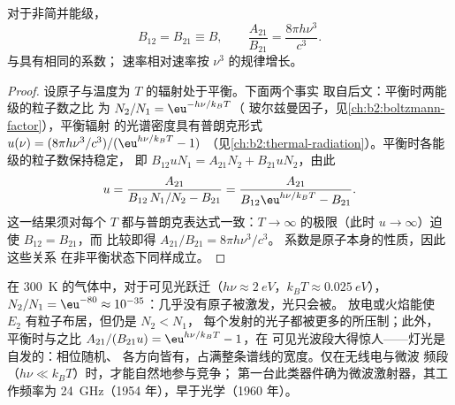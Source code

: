 \begin{proposition}[爱因斯坦关系]\label{prop:b2:laser:einstein}
对于非简并能级，
\[
B_{12} = B_{21} \equiv B, \qquad
\frac{A_{21}}{B_{21}} = \frac{8\pi h\nu^3}{c^3}.
\]
与具有相同的系数；
速率相对速率按 $\nu^3$ 的规律增长。
\end{proposition}

\begin{proof}
设原子与温度为 $T$ 的辐射处于平衡。下面两个事实
取自后文：平衡时两能级的粒子数之比
为 $N_2/N_1 = \eu^{-h\nu/k_BT}$（
玻尔兹曼因子，见\cref{ch:b2:boltzmann-factor}），平衡辐射
的光谱密度具有普朗克形式
$u(\nu) = (8\pi h\nu^3/c^3)/(\eu^{h\nu/k_BT} - 1)$
（见\cref{ch:b2:thermal-radiation}）。平衡时各能级的粒子数保持稳定，
即 $B_{12}uN_1 = A_{21}N_2 + B_{21}uN_2$，由此
\[
u = \frac{A_{21}}{B_{12}\,N_1/N_2 - B_{21}}
  = \frac{A_{21}}{B_{12}\eu^{h\nu/k_BT} - B_{21}}.
\]
这一结果须对每个 $T$ 都与普朗克表达式一致：$T \to \infty$
的极限（此时 $u \to \infty$）迫使 $B_{12} = B_{21}$，而
比较即得 $A_{21}/B_{21} = 8\pi h\nu^3/c^3$。
系数是原子本身的性质，因此这些关系
在非平衡状态下同样成立。
\end{proof}

\begin{remark}[为什么灯不能放大]\label{rem:b2:laser:lamps}
在 \qty{300}{K} 的气体中，对于可见光跃迁（$h\nu \approx
\qty{2}{eV}$，$k_BT \approx \qty{0.025}{eV}$），$N_2/N_1 = \eu^{-80} \approx
10^{-35}$：几乎没有原子被激发，光只会被。
放电或火焰能使 $E_2$ 有粒子布居，但仍是 $N_2 < N_1$，
每个发射的光子都被更多的所压制；此外，
平衡时与之比
$A_{21}/(B_{21}u) = \eu^{h\nu/k_BT} - 1$，在
可见光波段大得惊人——灯光是自发的：相位随机、
各方向皆有，占满整条谱线的宽度。仅在无线电与微波
频段（$h\nu \ll k_BT$）时，才能自然地参与竞争；
第一台此类器件确为微波激射器，其工作频率为
\qty{24}{GHz}（1954 年），早于光学（1960 年）。
\end{remark}


